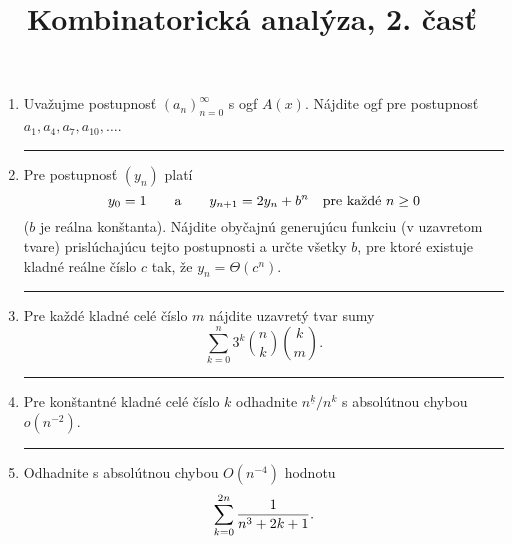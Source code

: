 \documentclass[a4paper, 12pt]{article}
\title{Kombinatorická analýza, 2. časť}
\date{}
\begin{document}
\begin{enumerate}
\item
Uvažujme postupnosť $(a_n)_{n=0}^\infty$ s ogf $A(x)$.
Nájdite ogf pre postupnosť $a_1, a_4, a_7, a_{10}, \dots$.

\bigskip\hrule

\item
Pre postupnosť $(y_n)$ platí
$$y_0 = 1\qquad\hbox{a}\qquad y_{n+1} = 2y_n + b^n\quad \hbox{pre každé $n\ge 0$}$$
 ($b$ je reálna konštanta).
Nájdite obyčajnú generujúcu funkciu (v uzavretom tvare) prislúchajúcu tejto postupnosti a určte všetky $b$, pre ktoré existuje kladné reálne číslo $c$ tak, že $y_n = \Theta(c^n)$.

\bigskip\hrule

\item
Pre každé kladné celé číslo $m$ nájdite uzavretý tvar sumy
$$
\sum_{k=0}^n 3^k{n\choose k}{k\choose m}.
$$

\bigskip\hrule

\item
Pre konštantné kladné celé číslo $k$ odhadnite $n^{\underline{k}}/n^k$ s absolútnou chybou $o(n^{-2})$.

\bigskip\hrule

\item
Odhadnite s absolútnou chybou $O(n^{-4})$ hodnotu
$$
\sum_{k=0}^{2n} {1\over n^3+2k+1}.
$$

\end{enumerate}
\end{document}
